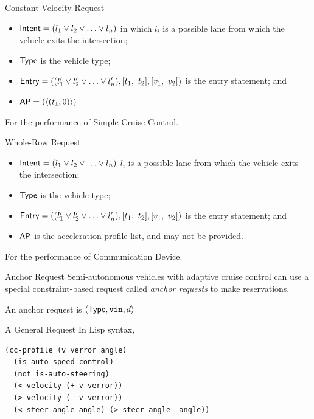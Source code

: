 \documentclass{beamer}
\begin{document}
\begin{frame}{Constant-Velocity Request}
\begin{itemize}
\item ${\sf Intent} = ( l_1 \vee l_2 \vee \ldots \vee l_n )$
in which $l_i$ is a possible lane from which the vehicle 
exits the intersection;
\item ${\sf Type}$ is the vehicle type;
\item ${\sf Entry} = (( l'_1 \vee l'_2 \vee \ldots \vee l'_n ), [t_1,\ t_2], [v_1,\ v_2])$
is the entry statement; and
\item ${\sf AP} = ( \langle (t_1, 0) \rangle )$
\end{itemize}

For the performance of Simple Cruise Control.
\end{frame}

\begin{frame}{Whole-Row Request}
\begin{itemize}
\item ${\sf Intent} = ( l_1 \vee l_2 \vee \ldots \vee l_n )$ $l_i$ is a possible lane from which the vehicle exits the intersection;
\item ${\sf Type}$ is the vehicle type;
\item ${\sf Entry} = (( l'_1 \vee l'_2 \vee \ldots \vee l'_n ), [t_1,\ t_2], [v_1,\ v_2])$ is the entry statement; and
\item ${\sf AP}$ is the acceleration profile list, and may not be
provided.
\end{itemize}

For the performance of Communication Device.
\end{frame}

\begin{frame}{Anchor Request}
Semi-autonomous vehicles with adaptive cruise control can use a special
constraint-based request called \emph{anchor requests} to make
reservations.\pause

\hfill

An anchor request is $\langle {\sf Type}, \texttt{vin},
d \rangle$
\end{frame}

\begin{frame}[fragile]{A General Request}
In Lisp syntax,

\begin{small}
\begin{verbatim}
(cc-profile (v verror angle)
  (is-auto-speed-control)
  (not is-auto-steering)
  (< velocity (+ v verror))
  (> velocity (- v verror))
  (< steer-angle angle) (> steer-angle -angle))
\end{verbatim}
\end{small}
\end{frame}
\end{document}

